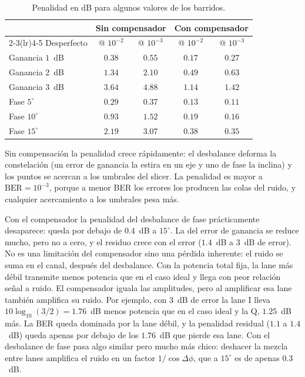 \begin{table}[H]
\centering
\small
\begin{tabular}{lcccc}
\toprule
& \multicolumn{2}{c}{Sin compensador} & \multicolumn{2}{c}{Con compensador} \\
\cmidrule(lr){2-3}\cmidrule(lr){4-5}
Desperfecto & @ $10^{-2}$ & @ $10^{-3}$ & @ $10^{-2}$ & @ $10^{-3}$ \\
\midrule
Ganancia $1$~dB      & $0.38$ & $0.55$ & $0.17$ & $0.27$ \\
Ganancia $2$~dB      & $1.34$ & $2.10$ & $0.49$ & $0.63$ \\
Ganancia $3$~dB      & $3.64$ & $4.88$ & $1.14$ & $1.42$ \\
Fase $5^\circ$       & $0.29$ & $0.37$ & $0.13$ & $0.11$ \\
Fase $10^\circ$      & $0.93$ & $1.52$ & $0.19$ & $0.16$ \\
Fase $15^\circ$      & $2.19$ & $3.07$ & $0.38$ & $0.35$ \\
\bottomrule
\end{tabular}
\caption{Penalidad en dB para algunos valores de los barridos.}
\label{tab:ej3}
\end{table}

Sin compensación la penalidad crece rápidamente: el desbalance deforma la
constelación (un error de ganancia la estira en un eje y uno de fase la
inclina) y los puntos se acercan a los umbrales del slicer. La penalidad
es mayor a $\mathrm{BER} = 10^{-3}$, porque a menor BER los errores los
producen las colas del ruido, y cualquier acercamiento a los umbrales pesa
más.

Con el compensador la penalidad del desbalance de fase prácticamente
desaparece: queda por debajo de $0.4$~dB a $15^\circ$. La del error de
ganancia se reduce mucho, pero no a cero, y el residuo crece con el error
($1.4$~dB a $3$~dB de error). No es una limitación del compensador sino
una pérdida inherente: el ruido se suma en el canal, después del
desbalance. Con la potencia total fija, la lane más débil transmite menos
potencia que en el caso ideal y llega con peor relación señal a ruido.
El compensador iguala las amplitudes, pero al amplificar esa lane también
amplifica su ruido. Por ejemplo, con $3$~dB de error la lane I lleva
$10\log_{10}(3/2) = 1.76$~dB menos potencia que en el caso ideal y la Q,
$1.25$~dB más. La BER queda dominada por la lane débil, y la penalidad
residual ($1.1$ a $1.4$~dB) queda apenas por debajo de los $1.76$~dB que
pierde esa lane. Con el desbalance de fase pasa algo
similar pero mucho más chico: deshacer la mezcla entre lanes amplifica el
ruido en un factor $1/\cos\Delta\phi$, que a $15^\circ$ es de apenas
$0.3$~dB.

